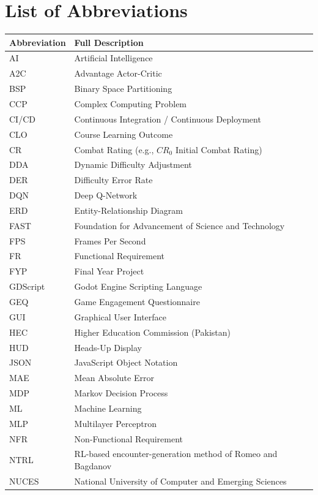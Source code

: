 \chapter*{List of Abbreviations}

\begin{longtable}{ll}
\toprule
\textbf{Abbreviation} & \textbf{Full Description} \\
\midrule
AI & Artificial Intelligence \\
A2C & Advantage Actor-Critic \\
BSP & Binary Space Partitioning \\
CCP & Complex Computing Problem \\
CI/CD & Continuous Integration / Continuous Deployment \\
CLO & Course Learning Outcome \\
CR & Combat Rating (e.g., $CR_0$ Initial Combat Rating) \\
DDA & Dynamic Difficulty Adjustment \\
DER & Difficulty Error Rate \\
DQN & Deep Q-Network \\
ERD & Entity-Relationship Diagram \\
FAST & Foundation for Advancement of Science and Technology \\
FPS & Frames Per Second \\
FR & Functional Requirement \\
FYP & Final Year Project \\
GDScript & Godot Engine Scripting Language \\
GEQ & Game Engagement Questionnaire \\
GUI & Graphical User Interface \\
HEC & Higher Education Commission (Pakistan) \\
HUD & Heads-Up Display \\
JSON & JavaScript Object Notation \\
MAE & Mean Absolute Error \\
MDP & Markov Decision Process \\
ML & Machine Learning \\
MLP & Multilayer Perceptron \\
NFR & Non-Functional Requirement \\
NTRL & RL-based encounter-generation method of Romeo and Bagdanov \\
NUCES & National University of Computer and Emerging Sciences \\

\end{longtable}

